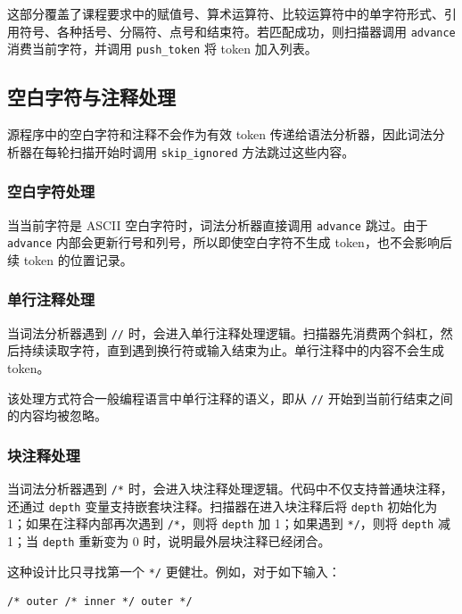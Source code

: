 \documentclass[UTF8,a4paper,12pt]{ctexart}
\begin{document}
这部分覆盖了课程要求中的赋值号、算术运算符、比较运算符中的单字符形式、引用符号、各种括号、分隔符、点号和结束符。若匹配成功，则扫描器调用 \texttt{advance} 消费当前字符，并调用 \texttt{push\_token} 将 token 加入列表。

\subsection{空白字符与注释处理}

源程序中的空白字符和注释不会作为有效 token 传递给语法分析器，因此词法分析器在每轮扫描开始时调用 \texttt{skip\_ignored} 方法跳过这些内容。

\subsubsection{空白字符处理}

当当前字符是 ASCII 空白字符时，词法分析器直接调用 \texttt{advance} 跳过。由于 \texttt{advance} 内部会更新行号和列号，所以即使空白字符不生成 token，也不会影响后续 token 的位置记录。

\subsubsection{单行注释处理}

当词法分析器遇到 \texttt{//} 时，会进入单行注释处理逻辑。扫描器先消费两个斜杠，然后持续读取字符，直到遇到换行符或输入结束为止。单行注释中的内容不会生成 token。

该处理方式符合一般编程语言中单行注释的语义，即从 \texttt{//} 开始到当前行结束之间的内容均被忽略。

\subsubsection{块注释处理}

当词法分析器遇到 \texttt{/*} 时，会进入块注释处理逻辑。代码中不仅支持普通块注释，还通过 \texttt{depth} 变量支持嵌套块注释。扫描器在进入块注释后将 \texttt{depth} 初始化为 1；如果在注释内部再次遇到 \texttt{/*}，则将 \texttt{depth} 加 1；如果遇到 \texttt{*/}，则将 \texttt{depth} 减 1；当 \texttt{depth} 重新变为 0 时，说明最外层块注释已经闭合。

这种设计比只寻找第一个 \texttt{*/} 更健壮。例如，对于如下输入：

\begin{lstlisting}[caption={嵌套块注释示例}]
/* outer /* inner */ outer */
\end{lstlisting}
\end{document}
